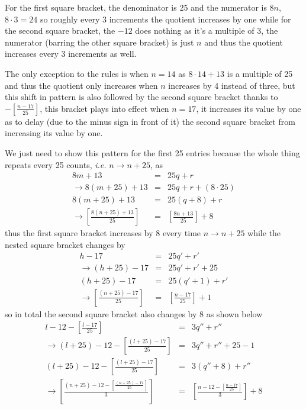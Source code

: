 \documentclass[aps,preprint,preprintnumbers,nofootinbib,showpacs,prd]{revtex4-1}
\newcommand{\ie}{{\it i.e.} }
\newcommand{\nbea}{\begin{eqnarray*}}
\newcommand{\neea}{\end{eqnarray*}}
\begin{document}
For the first square bracket, the denominator is 25 and the numerator is $8n$, $8\cdot3=24$ so roughly every 3 increments the quotient increases by one while for the second square bracket, the $-12$ does nothing as it's a multiple of 3, the numerator (barring the other square bracket) is just $n$ and thus the quotient increases every 3 increments as well.

The only exception to the rules is when $n=14$ as $8\cdot14+13$ is a multiple of 25 and thus the quotient only increases when $n$ increases by 4 instead of three, but this shift in pattern is also followed by the second square bracket thanks to $-\left \lbrack \frac{n-17}{25} \right \rbrack$, this bracket plays into effect when $n=17$, it increases its value by one as to delay (due to the minus sign in front of it) the second square bracket from increasing its value by one.

We just need to show this pattern for the first 25 entries because the whole thing repeats every 25 counts, \ie $n \to n+25$, as
%
\nbea
8m + 13 & = & 25q + r \\
\to 8(m+25) + 13 & = & 25q + r + (8\cdot 25) \\
8(m+25) + 13 & = & 25(q + 8) + r \\
\to \left \lbrack \frac{8(n+25)+13}{25} \right \rbrack & = & \left \lbrack \frac{8n+13}{25} \right \rbrack + 8
\neea
%
thus the first square bracket increases by 8 every time $n \to n+25$ while the nested square bracket changes by
%
\nbea
h -17 & = & 25q' + r' \\
\to (h+25) - 17 & = & 25q' + r' + 25 \\
(h+25) - 17 & = & 25(q' + 1) + r' \\
\to \left \lbrack \frac{(n+25)-17}{25} \right \rbrack & = & \left \lbrack \frac{n-17}{25} \right \rbrack + 1
\neea
%
so in total the second square bracket also changes by 8 as shown below
%
\nbea
l - 12 - \left \lbrack \frac{l-17}{25} \right \rbrack & = & 3q'' + r'' \\
\to (l+25) - 12 - \left \lbrack \frac{(l+25)-17}{25} \right \rbrack & = & 3q'' + r'' + 25 - 1\\
(l+25) - 12 - \left \lbrack \frac{(l+25)-17}{25} \right \rbrack  & = & 3(q'' + 8) + r'' \\
\to \left \lbrack \frac{(n+25) - 12 - \left \lbrack \frac{(n+25)-17}{25} \right \rbrack}{3} \right \rbrack  & = & \left \lbrack \frac{n - 12 - \left \lbrack \frac{n-17}{25} \right \rbrack}{3}\right \rbrack + 8
\neea
%
\end{document}
